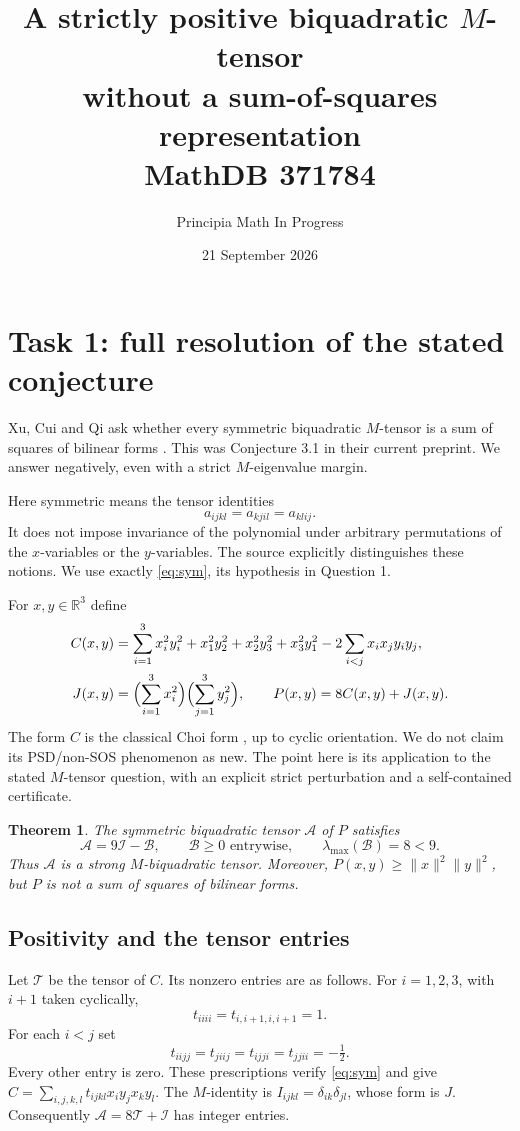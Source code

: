 \documentclass[11pt]{article}
\title{A strictly positive biquadratic $M$-tensor\protect\\without a sum-of-squares representation\protect\\\large MathDB 371784}
\author{Principia Math In Progress}
\date{21 September 2026}
\newtheorem{theorem}{Theorem}
\newcommand{\I}{\mathcal I}
\newcommand{\T}{\mathcal T}
\newcommand{\A}{\mathcal A}
\newcommand{\B}{\mathcal B}
\begin{document}
\maketitle

\section*{Task 1: full resolution of the stated conjecture}
Xu, Cui and Qi ask whether every symmetric biquadratic $M$-tensor
is a sum of squares of bilinear forms \cite[Question 1]{XCQ}.
This was Conjecture 3.1 in their current preprint.
We answer negatively, even with a strict $M$-eigenvalue margin.

Here symmetric means the tensor identities
\begin{equation}\label{eq:sym}
                 a_{ijkl}=a_{kjil}=a_{klij}.
\end{equation}
It does not impose invariance of the polynomial under arbitrary
permutations of the $x$-variables or the $y$-variables. The source
explicitly distinguishes these notions. We use exactly
\eqref{eq:sym}, its hypothesis in Question 1.

For $x,y\in\mathbb R^3$ define
\begin{align}
 C(x,y)&=\sum_{i=1}^3x_i^2y_i^2+
             x_1^2y_2^2+x_2^2y_3^2+x_3^2y_1^2
             -2\sum_{i<j}x_ix_jy_iy_j,\label{eq:choi}\\
 J(x,y)&=\Bigl(\sum_{i=1}^3x_i^2\Bigr)
              \Bigl(\sum_{j=1}^3y_j^2\Bigr),\qquad
 P(x,y)=8C(x,y)+J(x,y).\label{eq:P}
\end{align}
The form $C$ is the classical Choi form \cite{Choi}, up to cyclic
orientation. We do not claim its PSD/non-SOS phenomenon as new.
The point here is its application to the stated $M$-tensor question,
with an explicit strict perturbation and a self-contained certificate.

\begin{theorem}\label{thm:main}
The symmetric biquadratic tensor $\A$ of $P$ satisfies
\[
 \A=9\I-\B,\qquad \B\ge0\text{ entrywise},\qquad
                   \lambda_{\max}(\B)=8<9.
\]
Thus $\A$ is a strong $M$-biquadratic tensor. Moreover,
$P(x,y)\ge\|x\|^2\|y\|^2$, but $P$ is not a sum of squares
of bilinear forms.
\end{theorem}

\subsection*{Positivity and the tensor entries}
Let $\T$ be the tensor of $C$. Its nonzero entries are as follows.
For $i=1,2,3$, with $i+1$ taken cyclically,
\[
 t_{iiii}=t_{i,i+1,i,i+1}=1.
\]
For each $i<j$ set
\[
 t_{iijj}=t_{jiij}=t_{ijji}=t_{jjii}=-\tfrac12.
\]
Every other entry is zero. These prescriptions verify
\eqref{eq:sym} and give
$C=\sum_{i,j,k,l}t_{ijkl}x_iy_jx_ky_l$.
The $M$-identity is $I_{ijkl}=\delta_{ik}\delta_{jl}$,
whose form is $J$. Consequently $\A=8\T+\I$ has integer entries.
\end{document}
